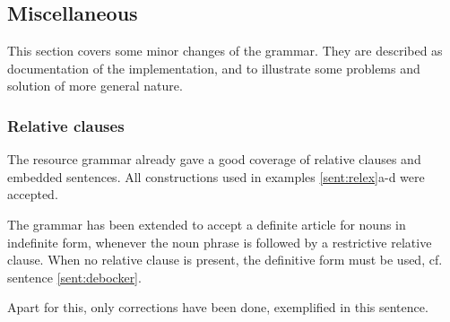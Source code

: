 \documentclass{report}
\begin{document}
\subsection{Miscellaneous}
This section covers some minor changes of the grammar.
They are described
as documentation of the implementation, and to illustrate some problems
and solution of more general nature.
\subsubsection{Relative clauses}
The resource grammar already gave a good coverage of relative clauses and embedded sentences.
All constructions used in examples \ref{sent:relex}a-d were accepted.
\label{sent:relex} %

The grammar has been extended to accept a definite article for
nouns in indefinite form, whenever the noun phrase is followed by a restrictive
relative clause.
When no relative clause is present, the definitive form must be used, cf.
sentence \ref{sent:debocker}.
\label{sent:debocker}

Apart for this, only corrections have been done, exemplified in
this sentence.
\end{document}
